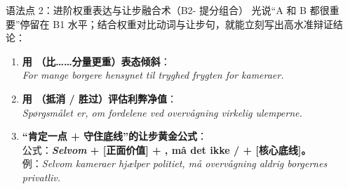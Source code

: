 \begin{grammatikbox}{语法点 2：进阶权重表达与让步融合术（B2- 提分组合）}
光说“A 和 B 都很重要”停留在 B1 水平；结合权重对比动词与让步句，就能立刻写出高水准辩证结论：
\begin{enumerate}
  \item \textbf{用 （比……分量更重）表态倾斜}：\\
    \textit{For mange borgere  hensynet til tryghed  frygten for kameraer.}
  \item \textbf{用 （抵消 / 胜过）评估利弊净值}：\\
    \textit{Spørgsmålet er, om fordelene ved overvågning virkelig  ulemperne.}
  \item \textbf{“肯定一点 + 守住底线”的让步黄金公式}：\\
    公式：\textbf{\textit{Selvom} + [正面价值] + , må det ikke  /  + [核心底线]。}\\
    例：\textit{Selvom kameraer hjælper politiet, må overvågning aldrig  borgernes privatliv.}
\end{enumerate}
\end{grammatikbox}


